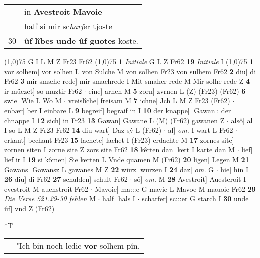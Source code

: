 \documentclass[8pt,a4paper,notitlepage]{article}
\begin{document}
\begin{table}[ht]
\begin{minipage}[t]{0.5\linewidth}
\begin{tabular}{rl}
 & in \textbf{Avestroit Mavoie}\\ 
 & half si mir sc\textit{harf}er tjoste\\ 
30 & \textbf{ûf} \textbf{lîbes unde ûf guotes} koste.\\ 
\end{tabular}
\scriptsize
\line(1,0){75} \newline
G I L M Z Fr23 Fr62 \newline
\line(1,0){75} \newline
\textbf{1} \textit{Initiale} G L Z Fr62  \textbf{19} \textit{Initiale} I  \newline
\line(1,0){75} \newline
\textbf{1} vor solhem] vor solhen L von Sulchē M von solhen Fr23 von sulhem Fr62 \textbf{2} diu] di Fr62 \textbf{3} mir smæhe rede] mir smachrede I Mit smaher rede M Mir solhe rede Z \textbf{4} ir müezet] so muztir Fr62  $\cdot$ eine] arnen M \textbf{5} zorn] zvrnen L (Z) (Fr23) (Fr62) \textbf{6} swie] Wie L Wo M  $\cdot$ vreislîche] freisam M \textbf{7} ichne] Jch L M Z Fr23 (Fr62)  $\cdot$ enbær] ber I einbare L \textbf{9} begreif] begraif in I \textbf{10} der knappe] [Gawan]: der chnappe I \textbf{12} sich] in Fr23 \textbf{13} Gawan] Gawane L (M) (Fr62) gawanen Z  $\cdot$ alsô] al I so L M Z Fr23 Fr62 \textbf{14} diu wart] Daz sý L (Fr62)  $\cdot$ al] \textit{om.} I wart L Fr62  $\cdot$ erkant] bechant Fr23 \textbf{15} lachete] lachet I (Fr23) erdachte M \textbf{17} zornes site] zornen siten I zorne site Z zors site Fr62 \textbf{18} kêrten dan] kert I karte dan M  $\cdot$ lief] lief ir I \textbf{19} si kômen] Sie kerten L Vnde quamen M (Fr62) \textbf{20} ligen] Legen M \textbf{21} Gawans] Gawansz L gawanes M Z \textbf{22} würz] wurzen I \textbf{24} daz] \textit{om.} G  $\cdot$ hie] hin I \textbf{26} diu] di Fr62 \textbf{27} schulden] schult Fr62  $\cdot$ sô] \textit{om.} M \textbf{28} Avestroit] Auesteroit I evestroit M auenstroit Fr62  $\cdot$ Mavoie] ma:::e G mavie L Mavoe M mauoie Fr62 \textbf{29} \textit{Die Verse 521.29-30 fehlen} M   $\cdot$ half] hals I  $\cdot$ scharfer] sc:::er G starch I \textbf{30} unde ûf] vnd Z (Fr62) \newline
\end{minipage}
\hspace{0.5cm}
\begin{minipage}[t]{0.5\linewidth}
\small
\begin{center}*T
\end{center}
\begin{tabular}{rl}
 & "Ich bin noch ledic \textbf{vor} solhem pîn.\\ 

\end{tabular}
\end{minipage}
\end{table}
\end{document}
